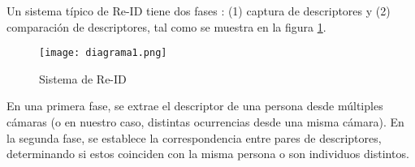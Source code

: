 \documentclass[../memoria.tex]{subfiles}
\begin{document}
\label{marco teorico}


\indent Un sistema típico de Re-ID tiene dos fases \cite{bedagkar2014survey}: (1) captura de descriptores y (2) comparación de descriptores, tal como se muestra en la figura \ref{fig:sistemaReID}. %

\begin{figure}[h!]
  \centering
  \texttt{[image: diagrama1.png]}
  \caption{Sistema de Re-ID \cite{bedagkar2014survey}}
  \label{fig:sistemaReID}
\end{figure}

\indent En una primera fase, se extrae el descriptor de una persona desde múltiples cámaras (o en nuestro caso, distintas ocurrencias desde una misma cámara). En la segunda fase, se establece la correspondencia entre pares de descriptores, determinando si estos coinciden con la misma persona o son individuos distintos.
\end{document}
